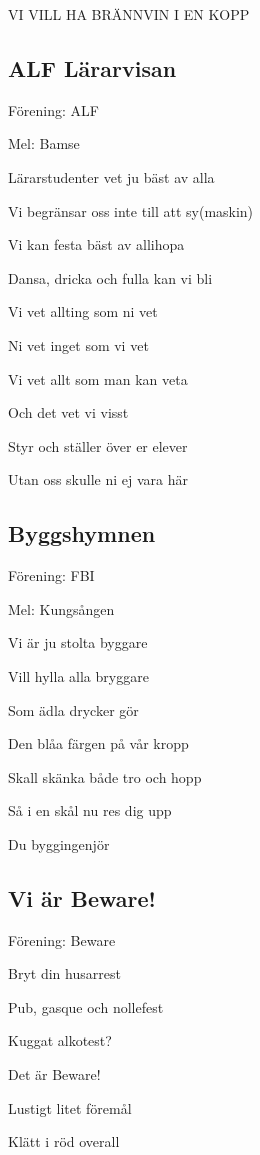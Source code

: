 VI VILL HA BRÄNNVIN I EN KOPP\bigskip

\subsection{\textbf{ALF Lärarvisan}}

Förening: ALF

Mel: Bamse

Lärarstudenter vet ju bäst av alla

Vi begränsar oss inte till att sy(maskin)

Vi kan festa bäst av allihopa

Dansa, dricka och fulla kan vi bli

Vi vet allting som ni vet

Ni vet inget som vi vet

Vi vet allt som man kan veta

Och det vet vi visst

Styr och ställer över er elever

Utan oss skulle ni ej vara här\bigskip

\subsection{\textbf{Byggshymnen}}

Förening: FBI

Mel: Kungsången

Vi är ju stolta byggare

Vill hylla alla bryggare

Som ädla drycker gör

Den blåa färgen på vår kropp

Skall skänka både tro och hopp

Så i en skål nu res dig upp

Du byggingenjör\bigskip

\subsection{\textbf{Vi är Beware!}}

Förening: Beware

Bryt din husarrest

Pub, gasque och nollefest

Kuggat alkotest?

Det är Beware!

Lustigt litet föremål

Klätt i röd overall

